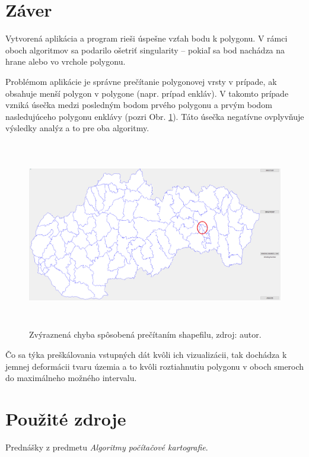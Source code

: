 \documentclass[11pt]{article}
\begin{document}
\newpage

\section{Záver}

Vytvorená aplikácia a program rieši úspešne vzťah bodu k polygonu. V rámci oboch algoritmov sa podarilo ošetriť singularity -- pokiaľ sa bod nachádza na hrane alebo vo vrchole polygonu. 

Problémom aplikácie je správne prečítanie polygonovej vrsty v prípade, ak obsahuje menší polygon v polygone (napr. prípad enkláv). V takomto prípade vzniká úsečka medzi posledným bodom prvého polygonu a prvým bodom nasledujúceho polygonu enklávy  (pozri Obr. \ref{fig:obr8}). Táto úsečka negatívne ovplyvňuje výsledky analýz a to pre oba algoritmy. 

\begin{figure}[h]
    \includegraphics[width=15.80cm, height=8.2cm]{obr8.png}
    \centering
    \caption{Zvýraznená chyba spôsobená prečítaním shapefilu, zdroj: autor.}
    \label{fig:obr8}
\end{figure}
\noindent Čo sa týka preškálovania vstupných dát kvôli ich vizualizácii, tak dochádza k jemnej deformácii tvaru územia a to kvôli roztiahnutiu polygonu v oboch smeroch do maximálneho možného intervalu.





\newpage
\setlength{\parindent}{0cm}
\section{Použité zdroje}
Prednášky z predmetu \textit{Algoritmy počítačové kartografie}.
\end{document}
